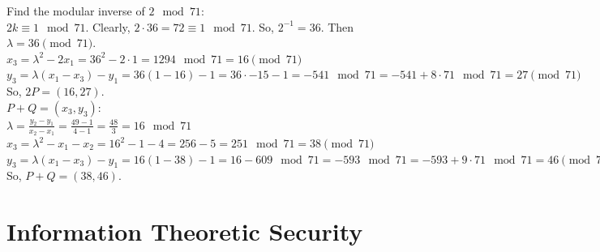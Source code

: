 \documentclass[10pt, oneside]{article}
\begin{document}
\begin{itemize}
    Find the modular inverse of $2 \mod 71$: \\
    $2k \equiv 1 \mod 71$. Clearly, $2\cdot 36 = 72 \equiv 1 \mod 71$. So, $2^{-1} = 36$. Then $\lambda = 36 \pmod{71}$.\\
    
    $x_3 = \lambda^2 - 2x_1 = 36^2 - 2 \cdot 1 = 1294 \mod 71 =  16 \pmod{71}$ \\
    $y_3 = \lambda(x_1 - x_3) - y_1 = 36(1-16) - 1 = 36 \cdot -15 - 1 = -541 \mod 71= -541 + 8\cdot 71 \mod 71 = 27 \pmod{71}$ \\
    
    So, $2P = (16, 27)$. \\

    $P + Q = (x_3, y_3):$\\
    $\lambda = \frac{y_2 - y_1}{x_2 - x_1} = \frac{49 - 1}{4 - 1} = \frac{48}{3} = 16 \mod 71$\\

    $x_3 = \lambda^2 - x_1 - x_2 = 16^2 - 1 - 4 = 256 - 5 = 251 \mod 71 =  38 \pmod{71}$ \\
    $y_3 = \lambda(x_1 - x_3) - y_1 = 16(1-38) - 1 = 16 - 609 \mod 71 = -593 \mod 71 = -593 + 9 \cdot 71 \mod 71= 46 \pmod{71}$ \\
    So, $P + Q = (38, 46)$.
\end{itemize}

\section{Information Theoretic Security}
\end{document}
